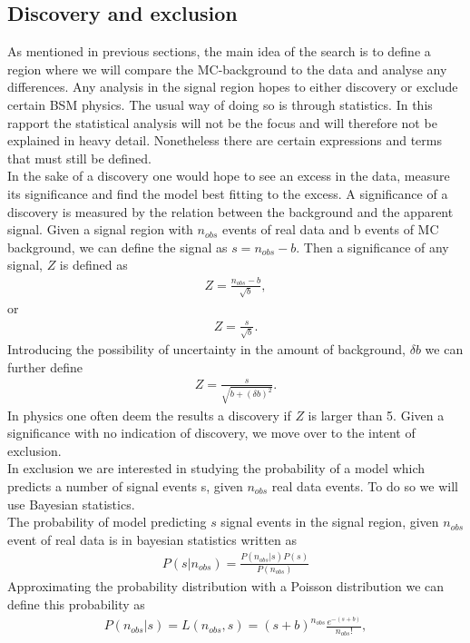 \documentclass{article}
\begin{document}
\subsection{Discovery and exclusion}
As mentioned in previous sections, the main idea of the search is to define a region where we will compare the MC-background to the data and analyse any differences. Any analysis in the signal region hopes to either discovery or exclude certain BSM physics. The usual way of doing so is through statistics. In this rapport the statistical analysis will not be the focus and will therefore not be explained in heavy detail. Nonetheless there are certain expressions and terms that must still be defined.
\\
In the sake of a discovery one would hope to see an excess in the data, measure its significance and find the model best fitting to the excess. A significance of a discovery is measured by the relation between the background and the apparent signal. Given a signal region with $n_{obs}$ events of real data and b events of MC background, we can define the signal as $s = n_{obs}-b$. Then a significance of any signal, $Z$ is defined as 
\begin{align}
    Z = \frac{n_{obs}-b}{\sqrt{b}},
\end{align}
or 
\begin{align}
    Z = \frac{s}{\sqrt{b}}.
\end{align}
Introducing the possibility of uncertainty in the amount of background, $\delta b$ we can further define
\begin{align}\label{eq:Z}
    Z = \frac{s}{\sqrt{b+(\delta b)^2}}.
\end{align}
In physics one often deem the results a discovery if $Z$ is larger than 5.  Given a significance with no indication of discovery, we move over to the intent of exclusion.\\
In exclusion we are interested in studying the probability of a model which predicts a number of signal events s, given $n_{obs}$ real data events. To do so we will use Bayesian statistics.
\\
The probability of model predicting $s$ signal events in the signal region, given $n_{obs}$ event of real data is in bayesian statistics written as
\begin{align}\label{eq:bays}
    P(s|n_{obs}) = \frac{P(n_{obs}|s)P(s)}{P(n_{obs})}
\end{align}
Approximating the probability distribution with a Poisson distribution we can define this probability as
\begin{align}\label{eq:Pns}
    P(n_{obs}|s) = L(n_{obs},s) = (s+b)^{n_{obs}} \frac{e^{-(s+b)}}{n_{obs}!},
\end{align}
\end{document}
